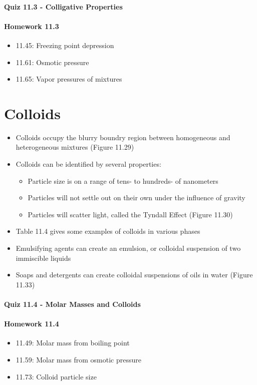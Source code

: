 \documentclass[12pt, openany, letterpaper]{memoir}
\begin{document}
\paragraph*{Quiz 11.3 - Colligative Properties}
\paragraph*{Homework 11.3}
\begin{itemize}
  \item 11.45: Freezing point depression
  \item 11.61: Osmotic pressure
  \item 11.65: Vapor pressures of mixtures
\end{itemize}

\section{Colloids}
\begin{itemize}
  \item Colloids occupy the blurry boundry region between homogeneous and heterogeneous mixtures (Figure 11.29)
  \item Colloids can be identified by several properties:
  \begin{itemize}
    \item Particle size is on a range of tens- to hundreds- of nanometers
    \item Particles will not settle out on their own under the influence of gravity
    \item Particles will scatter light, called the Tyndall Effect (Figure 11.30)
  \end{itemize}
  \item Table 11.4 gives some examples of colloids in various phases
  \item Emulsifying agents can create an emulsion, or colloidal suspension of two immiscible liquids
  \item Soaps and detergents can create colloidal suspensions of oils in water (Figure 11.33)
\end{itemize}
\paragraph*{Quiz 11.4 - Molar Masses and Colloids}
\paragraph*{Homework 11.4}
\begin{itemize}
  \item 11.49: Molar mass from boiling point
  \item 11.59: Molar mass from osmotic pressure
  \item 11.73: Colloid particle size
\end{itemize}
\end{document}
